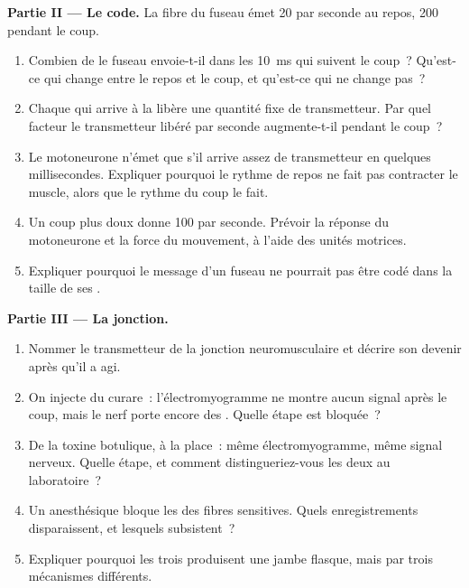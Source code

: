 \begin{problem}
\medskip
\noindent\textbf{Partie II --- Le code.}
La fibre du fuseau émet 20  par seconde au repos,
200 pendant le coup.
\begin{enumerate}[resume]
  \item Combien de  le fuseau envoie-t-il dans les
        \qty{10}{ms} qui suivent le coup~? Qu'est-ce qui change entre
        le repos et le coup, et qu'est-ce qui ne change pas~?
  \item Chaque  qui arrive à la  libère une
        quantité fixe de transmetteur. Par quel facteur le
        transmetteur libéré par seconde augmente-t-il pendant le
        coup~?
  \item Le motoneurone n'émet que s'il arrive assez de transmetteur en
        quelques millisecondes. Expliquer pourquoi le rythme de repos
        ne fait pas contracter le muscle, alors que le rythme du coup
        le fait.
  \item Un coup plus doux donne 100 par seconde. Prévoir la réponse du
        motoneurone et la force du mouvement, à l'aide des unités
        motrices.
  \item Expliquer pourquoi le message d'un fuseau ne pourrait pas être
        codé dans la taille de ses .
\end{enumerate}

\medskip
\noindent\textbf{Partie III --- La jonction.}
\begin{enumerate}[resume]
  \item Nommer le transmetteur de la jonction neuromusculaire et
        décrire son devenir après qu'il a agi.
  \item On injecte du curare~: l'électromyogramme ne montre aucun
        signal après le coup, mais le nerf porte encore des . Quelle étape est bloquée~?
  \item De la toxine botulique, à la place~: même électromyogramme,
        même signal nerveux. Quelle étape, et comment
        distingueriez-vous les deux au laboratoire~?
  \item Un anesthésique bloque les  des fibres
        sensitives. Quels enregistrements disparaissent, et lesquels
        subsistent~?
  \item Expliquer pourquoi les trois produisent une jambe flasque,
        mais par trois mécanismes différents.
\end{enumerate}


\end{problem}
